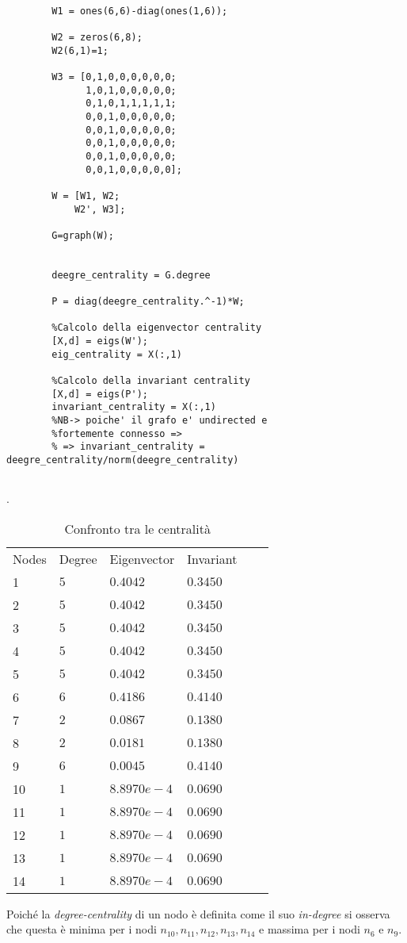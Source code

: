 \begin{alphaparts}
    \questionpart
    \begin{lstlisting}
       
        W1 = ones(6,6)-diag(ones(1,6));
        
        W2 = zeros(6,8);
        W2(6,1)=1;
        
        W3 = [0,1,0,0,0,0,0,0;
              1,0,1,0,0,0,0,0;
              0,1,0,1,1,1,1,1;
              0,0,1,0,0,0,0,0;
              0,0,1,0,0,0,0,0;
              0,0,1,0,0,0,0,0;
              0,0,1,0,0,0,0,0;
              0,0,1,0,0,0,0,0];
        
        W = [W1, W2;
            W2', W3];
        
        G=graph(W);
        
        
        deegre_centrality = G.degree
        
        P = diag(deegre_centrality.^-1)*W;
        
        %Calcolo della eigenvector centrality
        [X,d] = eigs(W');
        eig_centrality = X(:,1)
        
        %Calcolo della invariant centrality
        [X,d] = eigs(P');
        invariant_centrality = X(:,1)
        %NB-> poiche' il grafo e' undirected e 
        %fortemente connesso =>
        % => invariant_centrality = deegre_centrality/norm(deegre_centrality)      
        
    \end{lstlisting}
    
\begin{table}[htb]
    \centering
    \caption{Confronto tra le centralità}.
    \begin{tabular}{llllll}
     Nodes & Degree & Eigenvector & Invariant\\
    1 & $5$ & $0.4042$ & $0.3450$\\
    2 & $5$ & $0.4042$ & $0.3450$\\
    3 & $5$ & $0.4042$ & $0.3450$\\
    4 & $5$ & $0.4042$ & $0.3450$\\
    5 & $5$ & $0.4042$ & $0.3450$\\
    6 & $6$ & $0.4186$ & $0.4140$\\
    7 & $2$ & $0.0867$ & $0.1380$\\
    8 & $2$ & $0.0181$ & $0.1380$\\
    9 & $6$ & $0.0045$ & $0.4140$\\
    10 & $1$ & $8.8970e-4$ & $0.0690$\\
    11 & $1$ & $8.8970e-4$ & $0.0690$\\
    12 & $1$ & $8.8970e-4$ & $0.0690$\\
    13 & $1$ & $8.8970e-4$ & $0.0690$\\
    14 & $1$ & $8.8970e-4$ & $0.0690$\\
    \end{tabular}
 \end{table}
%
Poiché la \textit{degree-centrality} di un nodo è definita come il suo \textit{in-degree} si osserva che questa è minima per i nodi $n_{10},n_{11},n_{12},n_{13},n_{14}$ e massima per i nodi $n_6$ e $n_9$.


\end{alphaparts}
